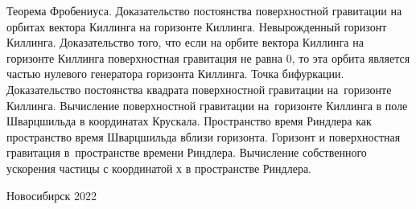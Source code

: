 \documentclass[12pt,pagesize,paper=192mm:108mm,landscape]{scrbook}
\begin{document}
\begin{titlepage}
  \vspace*{-0.5em}
  \begin{center}    

    



     \vfill

     \normalsize
     \begin{minipage}{0.9\linewidth}
      Теорема Фробениуса. Доказательство постоянства поверхностной
      гравитации на орбитах вектора Киллинга на горизонте
      Киллинга. Невырожденный горизонт Киллинга. Доказательство того,
      что если на орбите вектора Киллинга на горизонте Киллинга
      поверхностная гравитация не равна 0, то эта орбита является
      частью нулевого генератора горизонта Киллинга. Точка
      бифуркации. Доказательство постоянства квадрата поверхностной
      гравитации на~горизонте Киллинга. Вычисление поверхностной
      гравитации на~горизонте Киллинга в поле Шварцшильда в
      координатах Крускала. Пространство время Риндлера как
      пространство время Шварцшильда вблизи горизонта. Горизонт и
      поверхностная гравитация в~пространстве времени
      Риндлера. Вычисление собственного ускорения частицы с
      координатой $х$ в пространстве Риндлера.
    \end{minipage}
    \vfill

    \normalsize \ccbysa\hspace{0.5em}  Новосибирск 2022
  \end{center}
\end{titlepage}
\end{document}

